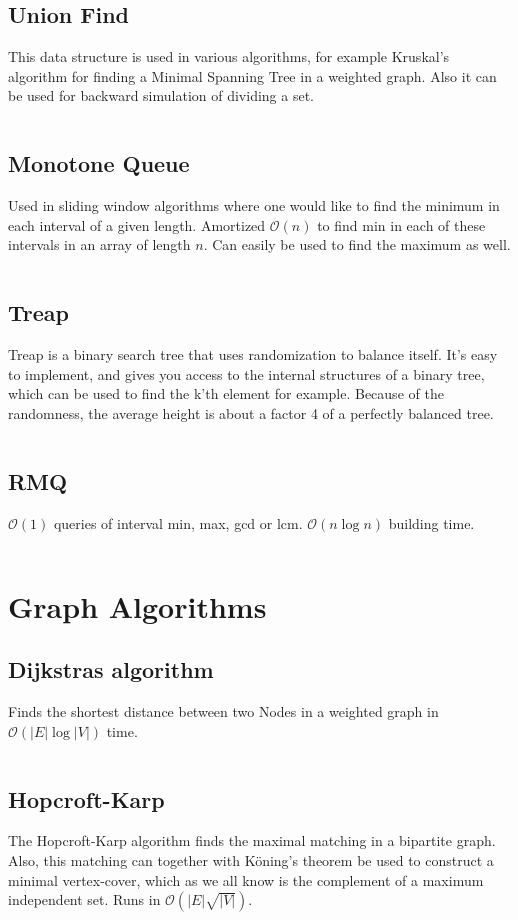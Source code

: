 \documentclass[8pt,a4paper,landscape,oneside]{amsart}
\newcommand{\codej}[1]{\inputminted[fontsize=\large,tabsize=2,baselinestretch=1]{java}{src/#1}}
\newcommand{\codep}[1]{\inputminted[fontsize=\large,tabsize=2,baselinestretch=1]{py}{src/#1}}
\newcommand{\bigO}{\mathcal{O}}
\begin{document}
\begin{multicols*}{2}
\begin{large}
    \subsection{Union Find}
        This data structure is used in various algorithms, for example Kruskal's algorithm for finding a Minimal Spanning Tree in a weighted graph. Also it can be used for backward simulation of dividing a set.
        \codep{datastructures/union_find.py}
    \subsection{Monotone Queue}
        Used in sliding window algorithms where one would like to find the minimum in each interval of a given length. Amortized $\bigO(n)$ to find min in each of these intervals in an array of length $n$. Can easily be used to find the maximum as well.
        \codej{datastructures/MinMonQue.java}
    \subsection{Treap}
        Treap is a binary search tree that uses randomization to balance itself.
        It's easy to implement, and gives you access to the internal structures of a binary tree,
        which can be used to find the k'th element for example. Because of the randomness, the average height is about a factor 4 of a perfectly balanced tree.
        \codej{datastructures/Treap.java}
    \subsection{RMQ}
        $\bigO(1)$ queries of interval min, max, gcd or lcm. $\bigO(n \log n)$ building time.
        \codep{datastructures/RMQ.py}
\section{Graph Algorithms}
    \subsection{Dijkstras algorithm}
        Finds the shortest distance between two Nodes in a weighted graph in $\bigO (|E| \log{|V|})$ time.
        \codep{graphs/dijkstra.py}
    \subsection{Hopcroft-Karp}
        The Hopcroft-Karp algorithm finds the maximal matching in a bipartite graph. Also, this matching can together with Köning's theorem be used to construct a minimal vertex-cover, which as we all know is the complement of a maximum independent set. Runs in $\bigO (|E|\sqrt{|V|})$.
        \codep{graphs/hopcroft_karp.py}

\end{large}
\end{multicols*}
\end{document}
